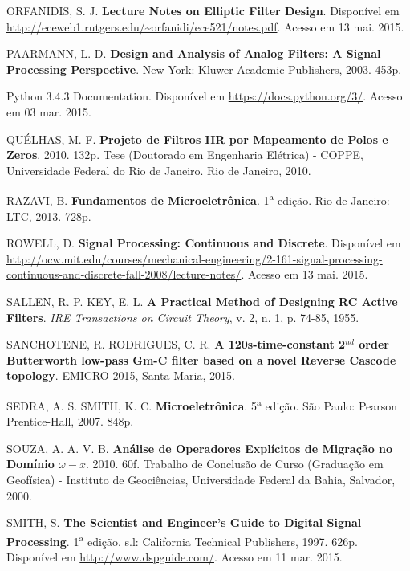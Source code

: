 \begin{thebibliography}{99}
 ORFANIDIS, S. J. \textbf{Lecture Notes on Elliptic Filter Design}. Disponível em \url{http://eceweb1.rutgers.edu/~orfanidi/ece521/notes.pdf}. Acesso em 13 mai. 2015.

 PAARMANN, L. D. \textbf{Design and Analysis of Analog Filters: A Signal Processing Perspective}. New York: Kluwer Academic Publishers, 2003. 453p.

 Python 3.4.3 Documentation. Disponível em \url{https://docs.python.org/3/}. Acesso em 03 mar. 2015.

 QUÉLHAS, M. F. \textbf{Projeto de Filtros IIR por Mapeamento de Polos e Zeros}. 2010. 132p. Tese (Doutorado em Engenharia Elétrica) - COPPE, Universidade Federal do Rio de Janeiro. Rio de Janeiro, 2010. %

 RAZAVI, B. \textbf{Fundamentos de Microeletrônica}. 1\textsuperscript{a} edição. Rio de Janeiro: LTC, 2013. 728p.

 ROWELL, D. \textbf{Signal Processing: Continuous and Discrete}. Disponível em \url{http://ocw.mit.edu/courses/mechanical-engineering/2-161-signal-processing-continuous-and-discrete-fall-2008/lecture-notes/}. Acesso em 13 mai. 2015.

 SALLEN, R. P. KEY, E. L. \textbf{A  Practical Method of Designing RC Active Filters}. \textit{IRE Transactions on  Circuit Theory}, v. 2, n. 1, p. 74-85, 1955.

 SANCHOTENE, R. RODRIGUES, C. R. \textbf{A 120s-time-constant 2$^{nd}$ order Butterworth low-pass Gm-C filter based on a novel Reverse Cascode topology}. EMICRO 2015, Santa Maria, 2015. %

 SEDRA, A. S. SMITH, K. C. \textbf{Microeletrônica}. 5\textsuperscript{a} edição. São Paulo: Pearson Prentice-Hall, 2007. 848p.

 SOUZA, A. A. V. B. \textbf{Análise de Operadores Explícitos de Migração no Domínio $\omega - x$}. 2010. 60f. Trabalho de Conclusão de Curso (Graduação em Geofísica) - Instituto de Geociências, Universidade Federal da Bahia, Salvador, 2000. %

 SMITH, S. \textbf{The Scientist and Engineer's Guide to Digital Signal Processing}. 1\textsuperscript{a}  edição. s.l: California Technical Publishers, 1997. 626p. Disponível em \url{http://www.dspguide.com/}. Acesso em 11 mar. 2015.


\end{thebibliography}
